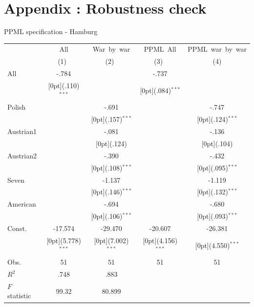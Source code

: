 \documentclass[12pt,a4paper,titlepage]{article}
\begin{document}
{\section{Appendix : Robustness check}
\caption{PPML specification - Hamburg}
\begin{tabular*}{\textwidth}{@{\extracolsep{\fill}}lcccc}				
	& \multicolumn{1}{c}{All} &	\multicolumn{1}{c}{War~by~war} &	\multicolumn{1}{c}{PPML~All} &	\multicolumn{1}{c}{PPML~war~by~war} \\
\cline{2-5}				
	& \multicolumn{1}{c}{(1)\mbox{\ }} &	\multicolumn{1}{c}{(2)\mbox{\ }} &	\multicolumn{1}{c}{(3)\mbox{\ }} &	\multicolumn{1}{c}{(4)} \\
\hline				
All &	-.784 &	&	-.737 &	\\
&	\raisebox{.7ex}[0pt]{\scriptsize (.110)$^{***}$} &	&	\raisebox{.7ex}[0pt]{\scriptsize (.084)$^{***}$} &	\\
Polish &	&	-.691 &	&	-.747 \\
&	&	\raisebox{.7ex}[0pt]{\scriptsize (.157)$^{***}$} &	&	\raisebox{.7ex}[0pt]{\scriptsize (.124)$^{***}$} \\
Austrian1 &	&	-.081 &	&	-.136 \\
&	&	\raisebox{.7ex}[0pt]{\scriptsize (.124)} &	&	\raisebox{.7ex}[0pt]{\scriptsize (.104)} \\
Austrian2 &	&	-.390 &	&	-.432 \\
&	&	\raisebox{.7ex}[0pt]{\scriptsize (.108)$^{***}$} &	&	\raisebox{.7ex}[0pt]{\scriptsize (.095)$^{***}$} \\
Seven &	&	-1.137 &	&	-1.119 \\
&	&	\raisebox{.7ex}[0pt]{\scriptsize (.146)$^{***}$} &	&	\raisebox{.7ex}[0pt]{\scriptsize (.132)$^{***}$} \\
American &	&	-.694 &	&	-.680 \\
&	&	\raisebox{.7ex}[0pt]{\scriptsize (.106)$^{***}$} &	&	\raisebox{.7ex}[0pt]{\scriptsize (.093)$^{***}$} \\
Const. &	-17.574 &	-29.470 &	-20.607 &	-26.381 \\
&	\raisebox{.7ex}[0pt]{\scriptsize (5.778)$^{***}$} &	\raisebox{.7ex}[0pt]{\scriptsize (7.002)$^{***}$} &	\raisebox{.7ex}[0pt]{\scriptsize (4.156)$^{***}$} &	\raisebox{.7ex}[0pt]{\scriptsize (4.550)$^{***}$} \\
Obs. &	51 &	51 &	51 &	51 \\
$ R^2$ &	.748 &	.883 &	&	\\
$ F$ statistic &	99.32 &	80.899 &	&	\\
\hline\hline				
\end{tabular*}\\~\\~\\		

}
\end{document}
